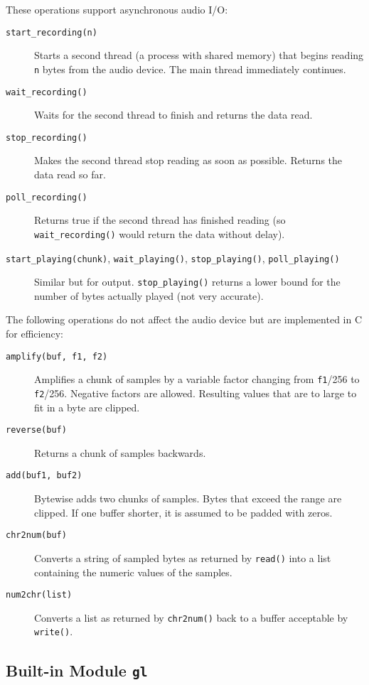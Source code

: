These operations support asynchronous audio I/O:
\begin{description}
\item[{\tt start\_recording(n)}]
Starts a second thread (a process with shared memory) that begins reading
{\tt n}
bytes from the audio device.
The main thread immediately continues.
\item[{\tt wait\_recording()}]
Waits for the second thread to finish and returns the data read.
\item[{\tt stop\_recording()}]
Makes the second thread stop reading as soon as possible.
Returns the data read so far.
\item[{\tt poll\_recording()}]
Returns true if the second thread has finished reading (so
{\tt wait\_recording()} would return the data without delay).
\item[{\tt start\_playing(chunk)}, {\tt wait\_playing()},
{\tt stop\_playing()}, {\tt poll\_playing()}]
Similar but for output.
{\tt stop\_playing()}
returns a lower bound for the number of bytes actually played (not very
accurate).
\end{description}

The following operations do not affect the audio device but are
implemented in C for efficiency:
\begin{description}
\item[{\tt amplify(buf, f1, f2)}]
Amplifies a chunk of samples by a variable factor changing from
{\tt f1}/256 to {\tt f2}/256.
Negative factors are allowed.
Resulting values that are to large to fit in a byte are clipped.         
\item[{\tt reverse(buf)}]
Returns a chunk of samples backwards.
\item[{\tt add(buf1, buf2)}]
Bytewise adds two chunks of samples.
Bytes that exceed the range are clipped.
If one buffer shorter, it is assumed to be padded with zeros.
\item[{\tt chr2num(buf)}]
Converts a string of sampled bytes as returned by {\tt read()} into
a list containing the numeric values of the samples.
\item[{\tt num2chr(list)}]
Converts a list as returned by
{\tt chr2num()}
back to a buffer acceptable by
{\tt write()}.
\end{description}

\subsection{Built-in Module {\tt gl}}

